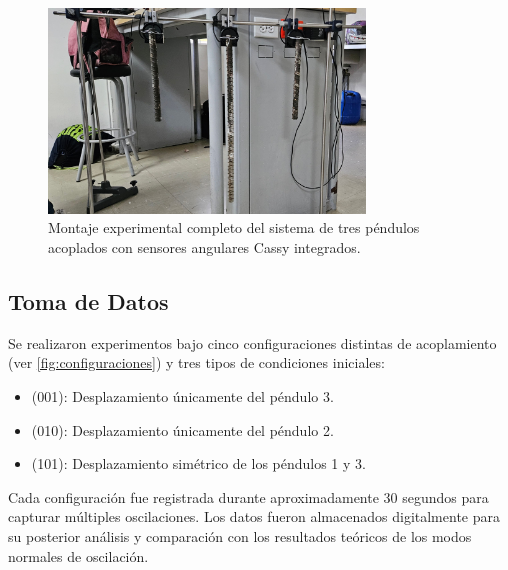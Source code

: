 \begin{figure}[htbp!]
  \centering
  \includegraphics[width=0.75\textwidth]{Figures/set-up.jpeg}
  \caption{Montaje experimental completo del sistema de tres
  p\'endulos acoplados con sensores angulares Cassy integrados.}
  \label{fig:montaje}
\end{figure}

\subsection*{Toma de Datos}

Se realizaron experimentos bajo cinco configuraciones distintas
de acoplamiento (ver \cref{fig:configuraciones}) y tres tipos de
condiciones iniciales:
\begin{itemize}
  \item (001): Desplazamiento \'unicamente del p\'endulo 3.
  \item (010): Desplazamiento \'unicamente del p\'endulo 2.
  \item (101): Desplazamiento sim\'etrico de los p\'endulos 1 y 3.
\end{itemize}
Cada configuraci\'on fue registrada durante aproximadamente 30
segundos para capturar m\'ultiples oscilaciones.
Los datos fueron almacenados digitalmente para su posterior
an\'alisis y comparaci\'on con los resultados te\'oricos de los
modos normales de oscilaci\'on.
